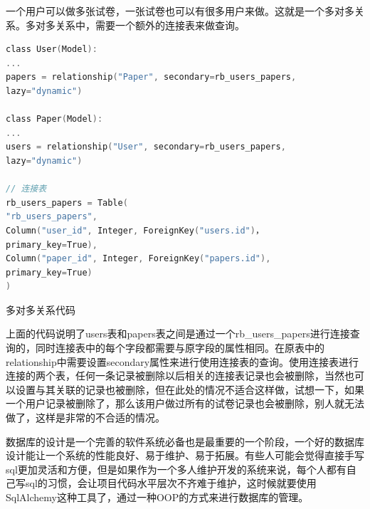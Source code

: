 一个用户可以做多张试卷，一张试卷也可以有很多用户来做。这就是一个多对多关系。多对多关系中，需要一个额外的连接表来做查询。

\begin{lstlisting}[language=C]
class User(Model):
...
papers = relationship("Paper", secondary=rb_users_papers,
lazy="dynamic")

class Paper(Model):
...
users = relationship("User", secondary=rb_users_papers,
lazy="dynamic")

// 连接表
rb_users_papers = Table(
"rb_users_papers",
Column("user_id", Integer, ForeignKey("users.id")，
primary_key=True),
Column("paper_id", Integer, ForeignKey("papers.id"),
primary_key=True)
)
\end{lstlisting}

\begin{center}
	{\small 多对多关系代码}
\end{center}

上面的代码说明了users表和papers表之间是通过一个rb\_users\_papers进行连接查询的，同时连接表中的每个字段都需要与原字段的属性相同。在原表中的relationship中需要设置secondary属性来进行使用连接表的查询。使用连接表进行连接的两个表，任何一条记录被删除以后相关的连接表记录也会被删除，当然也可以设置与其关联的记录也被删除，但在此处的情况不适合这样做，试想一下，如果一个用户记录被删除了，那么该用户做过所有的试卷记录也会被删除，别人就无法做了，这样是非常的不合适的情况。

数据库的设计是一个完善的软件系统必备也是最重要的一个阶段，一个好的数据库设计能让一个系统的性能良好、易于维护、易于拓展。有些人可能会觉得直接手写sql更加灵活和方便，但是如果作为一个多人维护开发的系统来说，每个人都有自己写sql的习惯，会让项目代码水平层次不齐难于维护，这时候就要使用SqlAlchemy这种工具了，通过一种OOP的方式来进行数据库的管理。